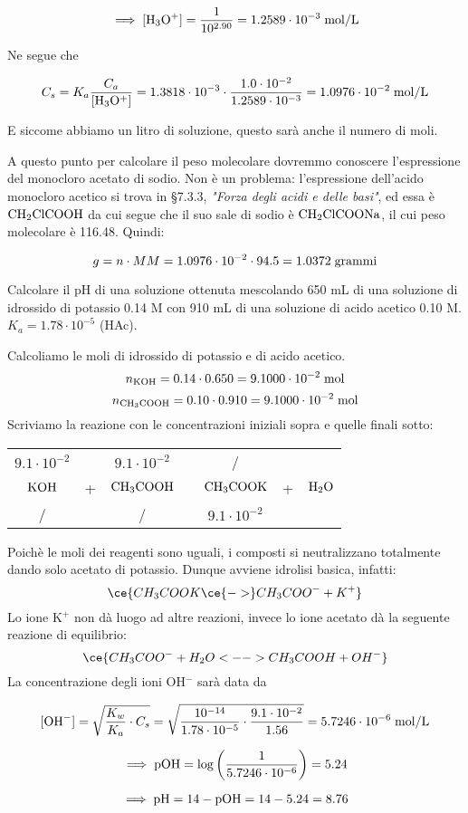 \begin{soluzione}
$$\implies
\rm [H_3O^+]=\frac{1}{10^{2.90}}
=1.2589 \cdot 10^{-3} \; \rm mol/L$$

Ne segue che

$$C_s=K_a\frac{C_a}{\rm [H_3O^+]}
=1.3818 \cdot 10^{-3} \cdot \frac{1.0 \cdot 10^{-2}}{1.2589 \cdot 10^{-3}}
=1.0976 \cdot 10^{-2} \; \rm mol/L$$

E siccome abbiamo un litro di soluzione, questo sarà anche il numero di moli.

A questo punto per calcolare il peso molecolare dovremmo conoscere l'espressione del monocloro acetato di sodio. Non è un problema: l'espressione dell'acido monocloro acetico si trova in §7.3.3, \textit{"Forza degli acidi e delle basi"}, ed essa è $\rm CH_2ClCOOH$ da cui segue che il suo sale di sodio è $\rm CH_2ClCOONa$, il cui peso molecolare è 116.48. Quindi:

$$g=n \cdot MM=1.0976 \cdot 10^{-2} \cdot 94.5=1.0372 \; \rm grammi$$

\end{soluzione}

\newpage

\begin{esercizio}
    Calcolare il pH di una soluzione ottenuta mescolando 650 mL di una soluzione di idrossido di potassio 0.14 M con 910 mL di una soluzione di acido acetico 0.10 M. $K_a = 1.78 \cdot 10^{-5}$ (HAc).
\end{esercizio}
\begin{soluzione}
    Calcoliamo le moli di idrossido di potassio e di acido acetico.
$$n_{\rm KOH}=0.14\cdot 0.650 = 9.1000\cdot 10^{-2} \; \rm mol$$
$$n_{\rm CH_3COOH}=0.10\cdot 0.910 = 9.1000\cdot 10^{-2} \; \rm mol$$
Scriviamo la reazione con le concentrazioni iniziali sopra e quelle finali sotto:

\begin{center}
    \begin{tabular}{ccccccc}
        $9.1\cdot 10^{-2}$ &  & $9.1\cdot 10^{-2}$ & & / &&\\
        $\rm KOH$ & + & $\rm CH_3COOH$ & \ce{->} & $\rm CH_3COOK$ & + & $\rm H_2O$\\
        / &  &  / & & $9.1\cdot 10^{-2}$ &&\\
    \end{tabular}
\end{center}

Poichè le moli dei reagenti sono uguali, i composti si neutralizzano totalmente dando solo acetato di potassio. Dunque avviene idrolisi basica, infatti:
$$\ce{CH_3COOK \ce{->} CH_3COO^- + K^+}$$
Lo ione K$^+$ non dà luogo ad altre reazioni, invece lo ione acetato dà la seguente reazione di equilibrio:
$$\ce{CH_3COO^- + H_2O <--> CH_3COOH + OH^-}$$
La concentrazione degli ioni OH$^-$ sarà data da 

$$[\text{OH}^-]
=\sqrt{\frac{K_w}{K_a}\cdot C_s}
=\sqrt{\frac{10^{-14}}{1.78 \cdot 10^{-5}} \cdot \frac{9.1\cdot 10^{-2}}{1.56}}
=5.7246 \cdot 10^{-6} \; \rm mol/L$$

$$\implies \rm pOH
=\log{\left(\frac{1}{5.7246 \cdot 10^{-6}}\right)}
=5.24$$

$$\implies \rm pH=14-pOH=14-5.24=8.76$$
\end{soluzione}

